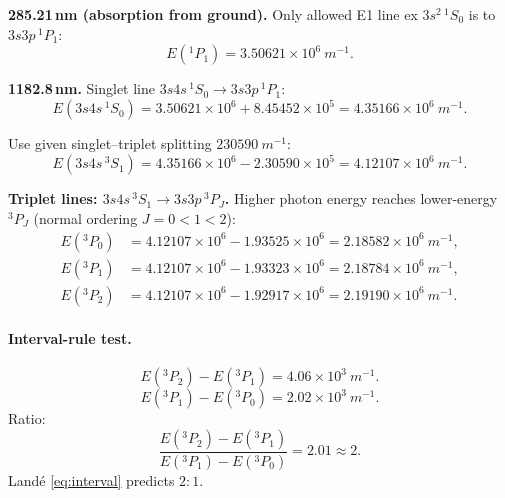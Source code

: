 \documentclass[11pt]{article}
\begin{document}
\textbf{285.21\,nm (absorption from ground).} Only allowed E1 line ex $3s^{2}\,{}^{1}\!S_0$ is to $3s3p\,{}^{1}\!P_1$:
\[
E({}^{1}\!P_1)=3.50621\times 10^{6}\ \unit{m^{-1}}.
\]

\textbf{1182.8\,nm.} Singlet line $3s4s\,{}^{1}\!S_0\to 3s3p\,{}^{1}\!P_1$:
\[
E(3s4s\,{}^{1}\!S_0)=3.50621\times 10^{6}+8.45452\times 10^{5}=4.35166\times 10^{6}\ \unit{m^{-1}}.
\]

Use given singlet--triplet splitting $\SI{230590}{m^{-1}}$:
\[
E(3s4s\,{}^{3}\!S_1)=4.35166\times 10^{6}-2.30590\times 10^{5}=4.12107\times 10^{6}\ \unit{m^{-1}}.
\]

\textbf{Triplet lines: $3s4s\,{}^{3}\!S_1\to 3s3p\,{}^{3}\!P_{J}$.} Higher photon energy reaches lower-energy $^{3}\!P_J$ (normal ordering $J=0<1<2$):
\begin{align*}
E({}^{3}\!P_0)&=4.12107\times 10^{6}-1.93525\times 10^{6}=2.18582\times 10^{6}\ \unit{m^{-1}},\\
E({}^{3}\!P_1)&=4.12107\times 10^{6}-1.93323\times 10^{6}=2.18784\times 10^{6}\ \unit{m^{-1}},\\
E({}^{3}\!P_2)&=4.12107\times 10^{6}-1.92917\times 10^{6}=2.19190\times 10^{6}\ \unit{m^{-1}}.
\end{align*}

\paragraph{Interval-rule test.}
\[
E({}^{3}\!P_2)-E({}^{3}\!P_1)=4.06\times 10^{3}\ \unit{m^{-1}}.
\]
\[
E({}^{3}\!P_1)-E({}^{3}\!P_0)=2.02\times 10^{3}\ \unit{m^{-1}}.
\]
Ratio:
\[
\frac{E({}^{3}\!P_2)-E({}^{3}\!P_1)}{E({}^{3}\!P_1)-E({}^{3}\!P_0)}=2.01\approx 2.
\]
Land\'e \eqref{eq:interval} predicts $2:1$. 
\end{document}
